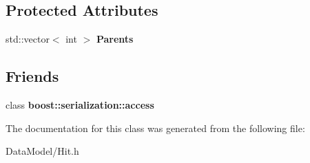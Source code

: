 \subsection*{Protected Attributes}
\begin{DoxyCompactItemize}
\item 
\hypertarget{classMCHit_a7fbd3892b201ed3790da046e63aed9d5}{std\-::vector$<$ int $>$ {\bfseries Parents}}\label{classMCHit_a7fbd3892b201ed3790da046e63aed9d5}

\end{DoxyCompactItemize}
\subsection*{Friends}
\begin{DoxyCompactItemize}
\item 
\hypertarget{classMCHit_ac98d07dd8f7b70e16ccb9a01abf56b9c}{class {\bfseries boost\-::serialization\-::access}}\label{classMCHit_ac98d07dd8f7b70e16ccb9a01abf56b9c}

\end{DoxyCompactItemize}


The documentation for this class was generated from the following file\-:\begin{DoxyCompactItemize}
\item 
Data\-Model/Hit.\-h\end{DoxyCompactItemize}
